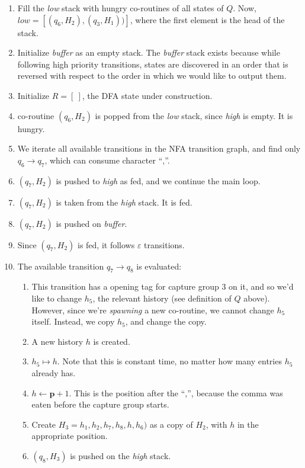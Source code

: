 \documentclass[11pt]{Thesis}
\theoremstyle{definition}
\newcommand{\pos}{\mathbf{\mathbf{p}}}
\begin{document}
\begin{example}
\begin{enumerate}
\item Fill the \emph{low} stack with hungry co-routines of all states of $Q$.
  Now, $\mathit{low}=[(q_6, H_2), (q_3, H_1))]$, where the first element is the
  head of the stack.
\item Initialize \emph{buffer} as an empty stack. 
  The \emph{buffer} stack exists because while following high priority
  transitions, states are discovered in an order that is reversed with respect
  to the order in which we would like to output them.
\item Initialize $R=[\ ]$, the DFA state under construction.
\item co-routine $(q_6,H_2)$ is popped from the \emph{low} stack, since
  \emph{high} is empty. It is hungry.
\item We iterate all available transitions in the NFA transition graph, and
  find only $q_6\rightarrow q_7$, which can consume character ``,''.
\item $(q_7, H_2)$ is pushed to \emph{high} as fed, and we continue the main loop.
\item $(q_7, H_2)$ is taken from the \emph{high} stack. It is fed.
\item $(q_7, H_2)$ is pushed on \emph{buffer}.
\item Since $(q_7, H_2)$ is fed, it follows $\varepsilon$ transitions.
\item The available transition $q_7\rightarrow q_8$ is evaluated:
  \begin{enumerate}
    \item 	This transition has a opening tag for capture group 3 on it, and so we'd like to change $h_5$, 
      the relevant history (see definition of $Q$ above). However, since we're \emph{spawning} a new co-routine, we cannot change $h_5$ itself.
      Instead, we copy $h_5$, and change the copy.
    \item	A new history $h$ is created.
    \item 	$h_5 \mapsto h$. Note that this is constant time, no matter how many entries $h_5$ already has.
    \item 	$h\leftarrow\pos+1$. This is the position after the ``,'', because the comma was eaten before the capture
        group starts.
    \item	Create $H_3 = h_1, h_2, h_7, h_8, h, h_6)$ as a copy of $H_2$, with $h$ in the appropriate position.
    \item $(q_8, H_3)$ is pushed on the \emph{high} stack.

\end{enumerate}
\end{enumerate}
\end{example}
\end{document}
